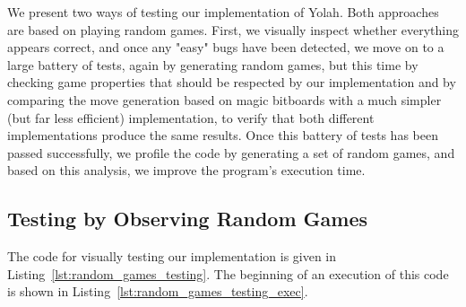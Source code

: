 \documentclass[12pt,a4paper,twoside,openright]{book}
\begin{document}
We present two ways of testing our implementation of Yolah. Both approaches are based on playing random games. First, we visually inspect whether everything appears correct, and once any "easy" bugs have been detected, we move on to a large battery of tests, again by generating random games, but this time by checking game properties that should be respected by our implementation and by comparing the move generation based on magic bitboards with a much simpler (but far less efficient) implementation, to verify that both different implementations produce the same results. Once this battery of tests has been passed successfully, we profile the code by generating a set of random games, and based on this analysis, we improve the program's execution time.

\subsection{Testing by Observing Random Games}


The code for visually testing our implementation is given in Listing~\ref{lst:random_games_testing}. The beginning of an execution of this code is shown in Listing~\ref{lst:random_games_testing_exec}.
\end{document}
